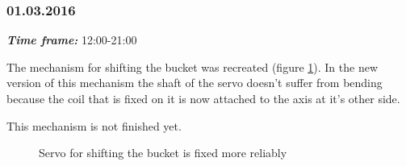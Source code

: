 \subsubsection{01.03.2016}
\textit{\textbf{Time frame:}} 12:00-21:00 

The mechanism for shifting the bucket was recreated (figure \ref{Shiftbuc2.8}). In the new version of this mechanism the shaft of the servo doesn't suffer from bending because the coil that is fixed on it is now attached to the axis at it's other side. 

This mechanism is not finished yet.

\begin{figure}[H]
	\begin{minipage}[h]{1\linewidth}
		\caption{Servo for shifting the bucket is fixed more reliably}
		\label{Shiftbuc2.8}
	\end{minipage}
\end{figure}
